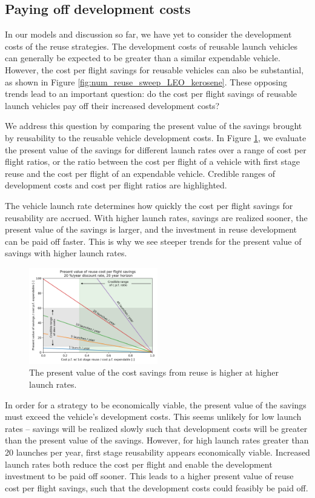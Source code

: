 \documentclass[conf]{new-aiaa}
\begin{document}
\begin{multicols}{2}
\subsection{Paying off development costs}

In our models and discussion so far, we have yet to consider the development costs of the reuse strategies. The development costs of reusable launch vehicles can generally be expected to be greater than a similar expendable vehicle. However, the cost per flight savings for reusable vehicles can also be substantial, as shown in Figure \ref{fig:num_reuse_sweep_LEO_kerosene}. These opposing trends lead to an important question: do the cost per flight savings of reusable launch vehicles pay off their increased development costs? 

We address this question by comparing the present value of the savings brought by reusability to the reusable vehicle development costs. In Figure \ref{fig:reuse_npv}, we evaluate the present value of the savings for different launch rates over a range of cost per flight ratios, or the ratio between the cost per flight of a vehicle with first stage reuse and the cost per flight of an expendable vehicle. Credible ranges of development costs and cost per flight ratios are highlighted.

The vehicle launch rate determines how quickly the cost per flight savings for reusability are accrued. With higher launch rates, savings are realized sooner, the present value of the savings is larger, and the investment in reuse development can be paid off faster. This is why we see steeper trends for the present value of savings with higher launch rates. 

\begin{figure}[H]
    \centering
    \includegraphics[width=0.5\textwidth]{reuse_npv}
    \caption{\label{fig:reuse_npv} The present value of the cost savings from reuse is higher at higher launch rates.}
\end{figure}

In order for a strategy to be economically viable, the present value of the savings must exceed the vehicle's development costs. This seems unlikely for low launch rates -- savings will be realized slowly such that development costs will be greater than the present value of the savings. However, for high launch rates greater than 20 launches per year, first stage reusability appears economically viable. Increased launch rates both reduce the cost per flight and enable the development investment to be paid off sooner. This leads to a higher present value of reuse cost per flight savings, such that the development costs could feasibly be paid off.



\end{multicols}
\end{document}
